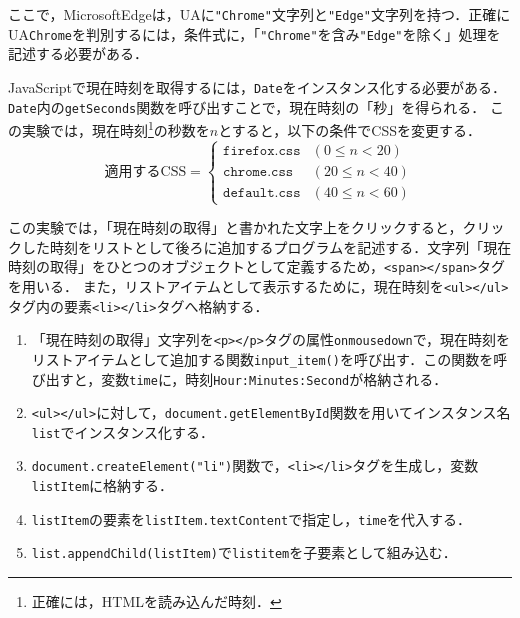 ここで，MicrosoftEdgeは，UAに\texttt{"Chrome"}文字列と\texttt{"Edge"}文字列を持つ．正確にUA\texttt{Chrome}を判別するには，条件式に，「\texttt{"Chrome"}を含み\texttt{"Edge"}を除く」処理を記述する必要がある．\\
\par
JavaScriptで現在時刻を取得するには，\texttt{Date}をインスタンス化する必要がある．\texttt{Date}内の\texttt{getSeconds}関数を呼び出すことで，現在時刻の「秒」を得られる．
この実験では，現在時刻\footnote{正確には，HTMLを読み込んだ時刻．}の秒数を\(n\)とすると，以下の条件でCSSを変更する．
\begin{equation*}
    \textrm{適用するCSS}=
    \begin{cases}
        \texttt{firefox.css} & (0\leq n<20)  \\
        \texttt{chrome.css}  & (20\leq n<40) \\
        \texttt{default.css} & (40\leq n<60)
    \end{cases}
\end{equation*}
\par
この実験では，「現在時刻の取得」と書かれた文字上をクリックすると，クリックした時刻をリストとして後ろに追加するプログラムを記述する．文字列「現在時刻の取得」をひとつのオブジェクトとして定義するため，\texttt{<span></span>}タグを用いる．
また，リストアイテムとして表示するために，現在時刻を\texttt{<ul></ul>}タグ内の要素\texttt{<li></li>}タグへ格納する．\par
\begin{enumerate}
    \item 「現在時刻の取得」文字列を\texttt{<p></p>}タグの属性\texttt{onmousedown}で，現在時刻をリストアイテムとして追加する関数\texttt{input\_item()}を呼び出す．この関数を呼び出すと，変数\texttt{time}に，時刻\texttt{Hour:Minutes:Second}が格納される．
    \item \texttt{<ul></ul>}に対して，\texttt{document.getElementById}関数を用いてインスタンス名\texttt{list}でインスタンス化する．
    \item \texttt{document.createElement("li")}関数で，\texttt{<li></li>}タグを生成し，変数\texttt{listItem}に格納する．
    \item \texttt{listItem}の要素を\texttt{listItem.textContent}で指定し，\texttt{time}を代入する．
    \item \texttt{list.appendChild(listItem)}で\texttt{listitem}を子要素として組み込む．
\end{enumerate}

